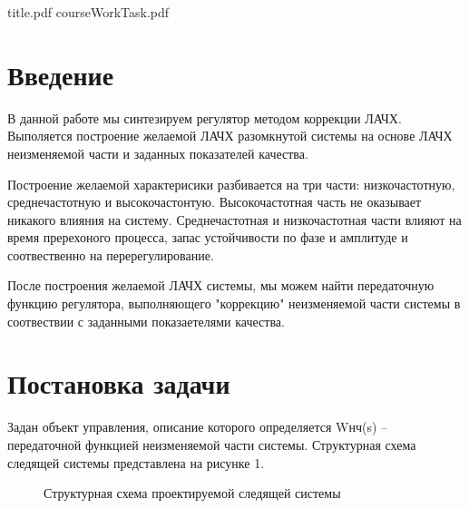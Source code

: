 \documentclass[russian, utf8]{eskdtext}
\begin{document}
 {title.pdf}
\newpage
 {courseWorkTask.pdf}
\newpage

\tableofcontents
\thispagestyle{empty}
\newpage

\section*{Введение}

В данной работе мы синтезируем регулятор методом коррекции ЛАЧХ. Выполяется построение желаемой ЛАЧХ разомкнутой системы на основе ЛАЧХ неизменяемой части и заданных показателей качества. \par
Построение желаемой характерисики разбивается на три части: низкочастотную, среднечастотную и высокочастонтую. Высокочастотная часть не оказывает никакого влияния на систему. Среднечастотная и низкочастотная части влияют на время пререхоного процесса, запас устойчивости по фазе и амплитуде и соотвественно на перерегулирование. \par
После построения желаемой ЛАЧХ системы, мы можем найти передаточную функцию регулятора, выполняющего "коррекцию" неизменяемой части системы в соотвествии с заданными показаетелями качества.

\newpage

\section{Постановка задачи}

Задан объект управления, описание которого определяется Wнч(s) – передаточной функцией неизменяемой части системы. Структурная схема следящей системы представлена на рисунке 1.

\begin{figure}[h!]
\centering
{}
\caption{Структурная схема проектируемой следящей системы}
\end{figure}
\end{document}
